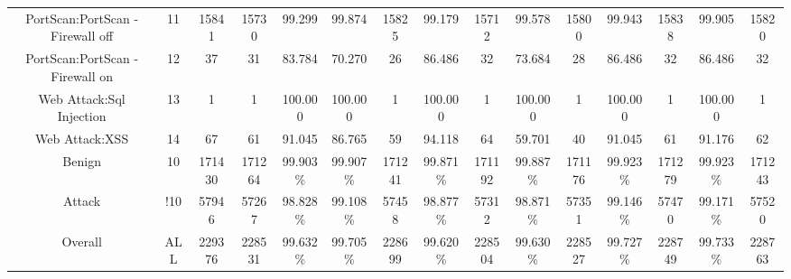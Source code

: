 \begin{table}[htb]
\begin{tabular}{@{}ccccccccccccccc@{}}
        PortScan:PortScan - Firewall off &  11 &  15841 &  15730 &  99.299 &  99.874 &  15825 &  99.179 &  15712 &  99.578 &  15800 &  99.943 &  15838 &  99.905 &  15820 \\
        PortScan:PortScan - Firewall on &  12 &  37 &  31 &  83.784 &  70.270 &  26 &  86.486 &  32 &  73.684 &  28 &  86.486 &  32 &  86.486 &  32 \\
        Web Attack:Sql Injection &  13 &  1 &  1 &  100.000 &  100.000 &  1 &  100.000 &  1 &  100.000 &  1 &  100.000 &  1 &  100.000 &  1 \\
        Web Attack:XSS &  14 &  67 &  61 &  91.045 &  86.765 &  59 &  94.118 &  64 &  59.701 &  40 &  91.045 &  61 &  91.176 &  62 \\
        Benign &  10 &  171430 &  171264 &  99.903\% &  99.907\% &  171241 &  99.871\% &  171192 &  99.887\% &  171176 &  99.923\% &  171279 &  99.923\% &  171243 \\
        Attack &  !10 &  57946 &  57267 &  98.828\% &  99.108\% &  57458 &  98.877\% &  57312 &  98.871\% &  57351 &  99.146\% &  57470 &  99.171\% &  57520 \\
        Overall &  ALL &  229376 &  228531 &  99.632\% &  99.705\% &  228699 &  99.620\% &  228504 &  99.630\% &  228527 &  99.727\% &  228749 &  99.733\% &  228763 \\
        \bottomrule
    \end{tabular}
\end{table}